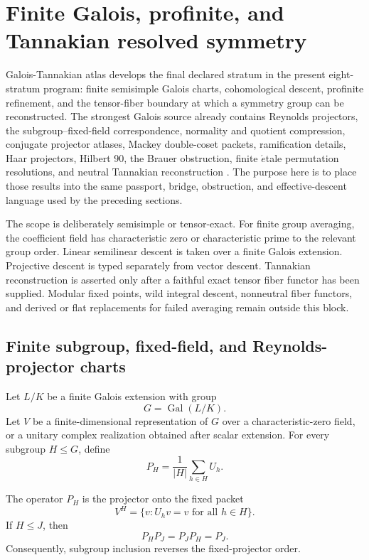 \section{Finite Galois, profinite, and Tannakian resolved symmetry}
\label{sec:block12-galois-tannakian}

Galois-Tannakian atlas develops the final declared stratum in the present eight-stratum program: finite semisimple Galois charts, cohomological descent, profinite refinement, and the tensor-fiber boundary at which a symmetry group can be reconstructed.  The strongest Galois source already contains Reynolds projectors, the subgroup--fixed-field correspondence, normality and quotient compression, conjugate projector atlases, Mackey double-coset packets, ramification details, Haar projectors, Hilbert 90, the Brauer obstruction, finite \(\acute{e}\)tale permutation resolutions, and neutral Tannakian reconstruction \cite{GAL}.  The purpose here is to place those results into the same passport, bridge, obstruction, and effective-descent language used by the preceding sections.

The scope is deliberately semisimple or tensor-exact.  For finite group averaging, the coefficient field has characteristic zero or characteristic prime to the relevant group order.  Linear semilinear descent is taken over a finite Galois extension.  Projective descent is typed separately from vector descent.  Tannakian reconstruction is asserted only after a faithful exact tensor fiber functor has been supplied.  Modular fixed points, wild integral descent, nonneutral fiber functors, and derived or flat replacements for failed averaging remain outside this block.

\subsection{Finite subgroup, fixed-field, and Reynolds-projector charts}
\label{subsec:block12-reynolds}

Let \(L/K\) be a finite Galois extension with group
\[
 G=\operatorname{Gal}(L/K).
\]
Let \(V\) be a finite-dimensional representation of \(G\) over a characteristic-zero field, or a unitary complex realization obtained after scalar extension.  For every subgroup \(H\leq G\), define
\[
 \boxed{
 P_H=\frac1{|H|}\sum_{h\in H}U_h.}
 \tag{12.1}
\]

\begin{theorem}
\label{thm:block12-reynolds}
The operator \(P_H\) is the projector onto the fixed packet
\[
 V^H=\{v:U_hv=v\text{ for all }h\in H\}.
\]
If \(H\leq J\), then
\[
 \boxed{P_HP_J=P_JP_H=P_J.}
 \tag{12.2}
\]
Consequently, subgroup inclusion reverses the fixed-projector order.
\end{theorem}

